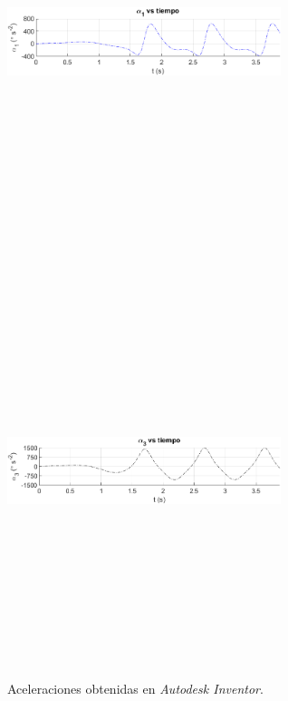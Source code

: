\documentclass[12pt]{article}
\begin{document}
\begin{multicols}{2}
\begin{figure} [H]
    \end{figure}
        \vspace{-20pt}
        \begin{figure} [H]
        \centerline{\includegraphics[width=8cm, height=12cm,keepaspectratio]{simulacion/alpha1.png}}
    \end{figure}
        \vspace{-20pt}
        \begin{figure} [H]
        \centerline{\includegraphics[width=8cm, height=12cm,keepaspectratio]{simulacion/alpha3.png}}
        \caption{Aceleraciones obtenidas en \textit{Autodesk Inventor}.}
        \label{}
    \end{figure}    
\end{multicols} 
\end{document}
